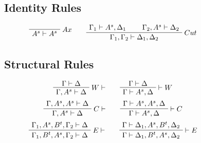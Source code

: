 \documentclass{article}
\newcommand{\seq}[2]{{#1} \vdash{} {#2}}
\newcommand{\pf}[2]{{#1}^{#2}} %
\theoremstyle{definition}
\begin{document}
\begin{figure}[p]
\subsection*{Identity Rules}
\[
\AxiomC{}
\RightLabel{$Ax$}
\UnaryInfC{$\seq{\pf{A}{s}}{\pf{A}{s}}$}
\DisplayProof
\qquad
\AxiomC{$\seq{\Gamma_1}{\pf{A}{s}, \Delta_1}$}
\AxiomC{$\seq{\Gamma_2, \pf{A}{s}}{\Delta_2}$}
\RightLabel{$Cut$}
\BinaryInfC{$\seq{\Gamma_1, \Gamma_2}{\Delta_1, \Delta_2}$}
\DisplayProof
\]

\subsection*{Structural Rules}
\[
\AxiomC{$\seq{\Gamma}{\Delta}$}
\RightLabel{$W\vdash$}
\UnaryInfC{$\seq{\Gamma, \pf{A}{s}}{\Delta}$}
\DisplayProof
\qquad
\AxiomC{$\seq{\Gamma}{\Delta}$}
\RightLabel{$\vdash W$}
\UnaryInfC{$\seq{\Gamma}{\pf{A}{s}, \Delta}$}
\DisplayProof
\]
\[
\AxiomC{$\seq{\Gamma, \pf{A}{s}, \pf{A}{s}}{\Delta}$}
\RightLabel{$C\vdash$}
\UnaryInfC{$\seq{\Gamma, \pf{A}{s}}{\Delta}$}
\DisplayProof
\qquad
\AxiomC{$\seq{\Gamma}{\pf{A}{s}, \pf{A}{s}, \Delta}$}
\RightLabel{$\vdash C$}
\UnaryInfC{$\seq{\Gamma}{\pf{A}{s}, \Delta}$}
\DisplayProof
\]
\[
\AxiomC{$\seq{\Gamma_1, \pf{A}{s}, \pf{B}{t}, \Gamma_2}{\Delta}$}
\RightLabel{$E\vdash$}
\UnaryInfC{$\seq{\Gamma_1, \pf{B}{t}, \pf{A}{s}, \Gamma_2}{\Delta}$}
\DisplayProof
\qquad
\AxiomC{$\seq{\Gamma}{\Delta_1, \pf{A}{s}, \pf{B}{t}, \Delta_2}$}
\RightLabel{$\vdash E$}
\UnaryInfC{$\seq{\Gamma}{\Delta_1, \pf{B}{t}, \pf{A}{s}, \Delta_2}$}
\DisplayProof
\]


\end{figure}
\end{document}
